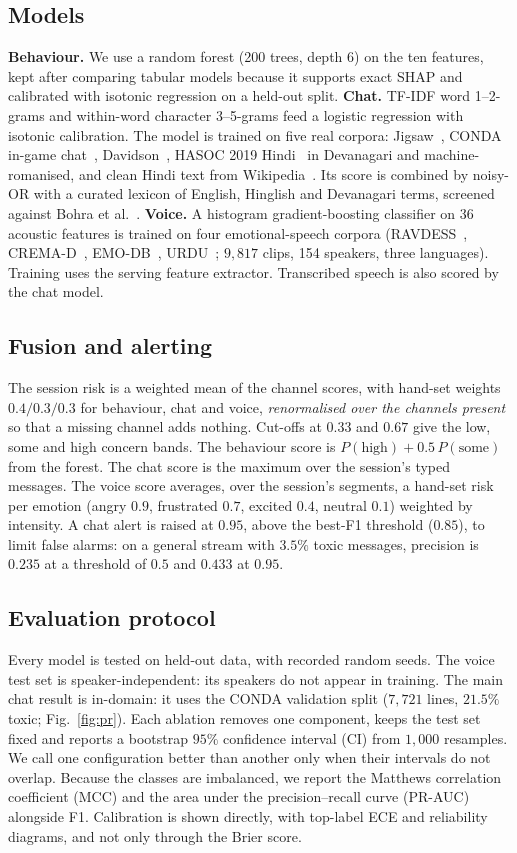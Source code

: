 \documentclass[conference]{IEEEtran}
\begin{document}
\subsection{Models}
\textbf{Behaviour.} We use a random forest (200 trees, depth 6) on the ten features,
kept after comparing tabular models because it supports exact SHAP and calibrated with
isotonic regression on a held-out split. \textbf{Chat.} TF-IDF word 1--2-grams and
within-word character 3--5-grams feed a logistic regression with isotonic calibration.
The model is trained on five real corpora: Jigsaw~\cite{jigsaw2018}, CONDA in-game
chat~\cite{conda2021}, Davidson~\cite{davidson2017}, HASOC 2019
Hindi~\cite{hasoc2019} in Devanagari and machine-romanised, and clean Hindi text from
Wikipedia~\cite{wikihi}. Its score is combined by noisy-OR with a curated lexicon of
English, Hinglish and Devanagari terms, screened against Bohra et
al.~\cite{bohra2018}. \textbf{Voice.} A histogram gradient-boosting classifier on 36
acoustic features is trained on four emotional-speech corpora
(RAVDESS~\cite{ravdess2018}, CREMA-D~\cite{cremad2014}, EMO-DB~\cite{emodb2005},
URDU~\cite{urdu2018}; $9{,}817$ clips, 154 speakers, three languages). Training uses
the serving feature extractor. Transcribed speech is also scored by the chat model.

\subsection{Fusion and alerting}
The session risk is a weighted mean of the channel scores, with hand-set weights
$0.4/0.3/0.3$ for behaviour, chat and voice, \emph{renormalised over the channels
present} so that a missing channel adds nothing. Cut-offs at $0.33$ and $0.67$ give the
low, some and high concern bands. The behaviour score is
$P(\text{high})+0.5\,P(\text{some})$ from the forest. The chat score is the maximum
over the session's typed messages. The voice score averages, over the session's
segments, a hand-set risk per emotion (angry $0.9$, frustrated $0.7$, excited $0.4$,
neutral $0.1$) weighted by intensity. A chat alert is raised at $0.95$, above the
best-F1 threshold ($0.85$), to limit false alarms: on a general stream with $3.5\%$
toxic messages, precision is $0.235$ at a threshold of $0.5$ and $0.433$ at $0.95$.

\subsection{Evaluation protocol}
Every model is tested on held-out data, with recorded random seeds. The voice test set
is speaker-independent: its speakers do not appear in training. The main chat result is
in-domain: it uses the CONDA validation split ($7{,}721$ lines, $21.5\%$ toxic;
Fig.~\ref{fig:pr}). Each ablation removes one component, keeps the test set fixed and
reports a bootstrap $95\%$ confidence interval (CI) from $1{,}000$ resamples. We call
one configuration better than another only when their intervals do not overlap. Because
the classes are imbalanced, we report the Matthews correlation coefficient (MCC) and
the area under the precision--recall curve (PR-AUC) alongside F1. Calibration is shown
directly, with top-label ECE and reliability diagrams, and not only through the Brier
score.
\end{document}
